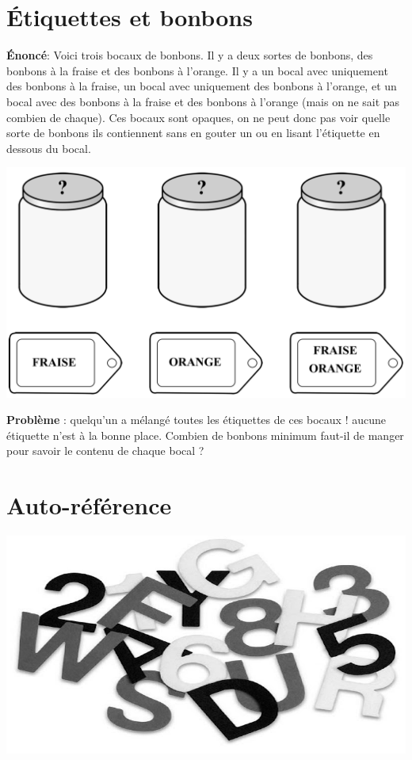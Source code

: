 \documentclass{article}
\begin{document}
\pagestyle{empty}



\section{Étiquettes et bonbons}

\textbf{Énoncé}: Voici trois bocaux de bonbons. Il y a deux sortes de bonbons, des bonbons à la fraise et des bonbons à l'orange. Il y a un bocal avec uniquement des bonbons à la fraise, un bocal avec uniquement des bonbons à l'orange, et un bocal avec des bonbons à la fraise et des bonbons à l'orange (mais on ne sait pas combien de chaque). Ces bocaux sont opaques, on ne peut donc pas voir quelle sorte de bonbons ils contiennent sans en gouter un ou en lisant l'étiquette en dessous du bocal. \\

\begin{center}
	\includegraphics[scale=0.5]{Figures/Etiquettes.png} 
\end{center}

\textbf{Problème }: quelqu'un a mélangé toutes les  étiquettes de ces bocaux ! aucune  étiquette n'est à la bonne place. Combien de bonbons minimum faut-il de manger pour savoir le contenu de chaque bocal ? \\


   


  
\section{Auto-référence} 

\begin{center}
	\includegraphics[scale=0.375]{Figures/lettres} 
\end{center}
\end{document}
